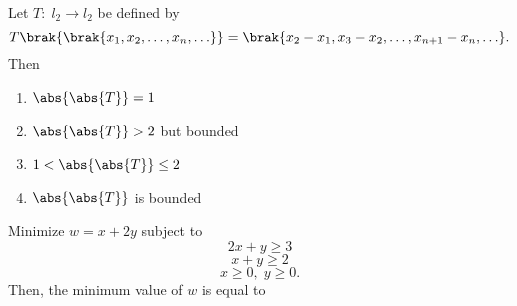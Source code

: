 \iffalse
\chapter{2016}
\section{ma}
\author{AI24BTECH11023 - Tarun Reddy Pakala}
\fi
\item Let $T:\;l_2\to l_2$ be defined by $$T\brak{\brak{x_1,x_2,\ldots,x_n,\ldots}}=\brak{x_2-x_1,x_3-x_2,\ldots,x_{n+1}-x_n,\ldots}.$$ Then
\begin{enumerate}
    \item $\abs{\abs{T}}=1$
    \item $\abs{\abs{T}}>2$ but bounded 
    \item $1<\abs{\abs{T}}\leq 2$
    \item $\abs{\abs{T}}$ is bounded
\end{enumerate}
\item Minimize $w=x+2y$ subject to $$2x+y\geq 3$$ $$x+y\geq 2$$ $$x\geq0,\;y\geq0.$$ Then, the minimum value of $w$ is equal to \underline{\hspace{2cm}}  

